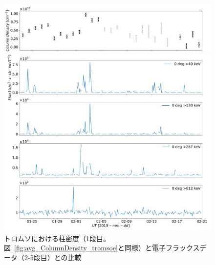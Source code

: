 \begin{figure}[htbp]
    \centering
    \begin{minipage}{\linewidth}
        \centering
        \includegraphics[width=\linewidth]{master_thesis_contents/master_thesis_fig/avg_ColumnDensity_tromsoe_trim.pdf}
    \end{minipage}
    \begin{minipage}{\linewidth}
        \centering
        \includegraphics[width=\linewidth]{master_thesis_contents/master_thesis_fig/poes_tromsoe_0deg.pdf}
    \end{minipage}
    \caption{トロムソにおける柱密度（1段目。図~\ref{fig:avg_ColumnDensity_tromsoe}と同様）と電子フラックスデータ（2-5段目）との比較}
    \label{fig:poes_mmcd_tromsoe}
\end{figure}

